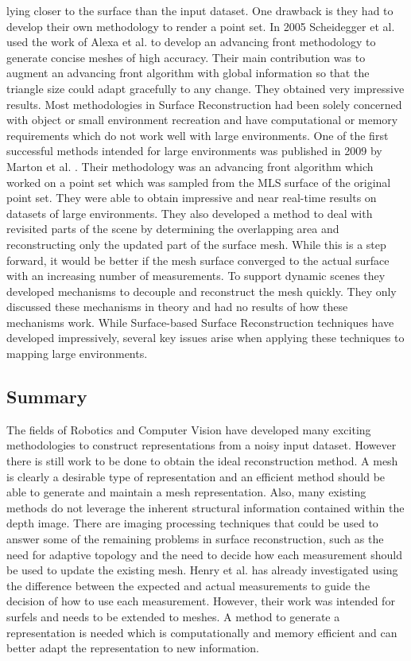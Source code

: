 lying closer to the surface than the input dataset. One drawback is they
had to develop their own methodology to render a point set. In 2005
Scheidegger et al. used the work of Alexa et al. to develop an advancing
front methodology to generate concise meshes of high accuracy. Their main
contribution was to augment an advancing front algorithm with global
information so that the triangle size could adapt gracefully to any change.
They obtained very impressive results. Most methodologies in Surface
Reconstruction had been solely concerned with object or small environment
recreation and have computational or memory requirements which do not work
well with large environments. One of the first successful methods intended
for large environments was published in 2009 by Marton et al.
\cite{Marton2009}. Their methodology was an advancing front algorithm which
worked on a point set which was sampled from the MLS surface of the
original point set. They were able to obtain impressive and near real-time
results on datasets of large environments. They also developed a method to
deal with revisited parts of the scene by determining the overlapping area
and reconstructing only the updated part of the surface mesh. While this is a
step forward, it would be better if the mesh surface converged
to the actual surface with an increasing number of measurements. To support
dynamic scenes they developed mechanisms to decouple and reconstruct the
mesh quickly. They only discussed these mechanisms in theory and had no
results of how these mechanisms work. While Surface-based Surface Reconstruction
techniques have developed impressively, several key issues arise
when applying these techniques to mapping large environments.

\subsection{Summary}

The fields of Robotics and Computer Vision have developed many exciting
methodologies to construct representations from a noisy input dataset.
However there is still work to be done to obtain the ideal reconstruction
method. A mesh is clearly a desirable type of representation and an
efficient method should be able to generate and maintain a mesh
representation. Also, many existing methods do not leverage the inherent
structural information contained within the depth image. There are imaging
processing techniques that could be used to answer some of the remaining
problems in surface reconstruction, such as the need for adaptive topology
and the need to decide how each measurement should be used to update the
existing mesh. Henry et al. \cite{Henry2012} has already investigated using
the difference between the expected and actual measurements to guide the
decision of how to use each measurement. However, their work was intended
for surfels and needs to be extended to meshes. A method to generate a
representation is needed which is computationally and memory efficient and
can better adapt the representation to new information.

